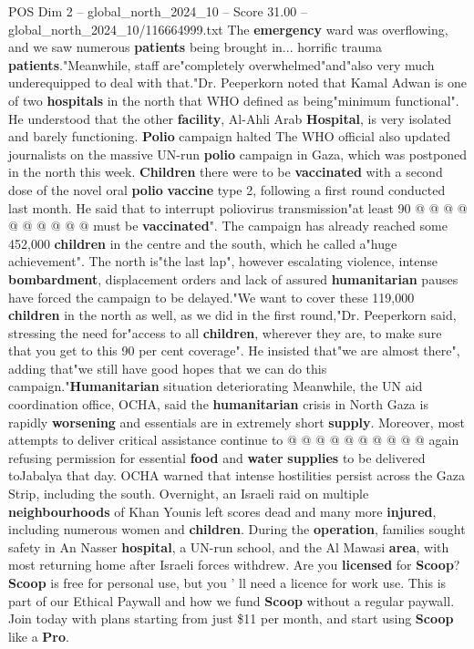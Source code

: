 \begin{textsample}{POS Dim 2 – global\_north\_2024\_10 – Score 31.00 – global\_north\_2024\_10/116664999.txt}
The \textbf{emergency} ward was overflowing, and we saw numerous \textbf{patients} being brought in... horrific trauma \textbf{patients}."Meanwhile, staff are"completely overwhelmed"and"also very much underequipped to deal with that."Dr.
Peeperkorn noted that Kamal Adwan is one of two \textbf{hospitals} in the north that WHO defined as being"minimum functional".
He understood that the other \textbf{facility}, Al-Ahli Arab \textbf{Hospital}, is very isolated and barely functioning. \textbf{Polio} campaign halted The WHO official also updated journalists on the massive UN-run \textbf{polio} campaign in Gaza, which was postponed in the north this week. \textbf{Children} there were to be \textbf{vaccinated} with a second dose of the novel oral \textbf{polio} \textbf{vaccine} type 2, following a first round conducted last month.
He said that to interrupt poliovirus transmission"at least 90 @ @ @ @ @ @ @ @ @ @ must be \textbf{vaccinated}".
The campaign has already reached some 452,000 \textbf{children} in the centre and the south, which he called a"huge achievement".
The north is"the last lap", however escalating violence, intense \textbf{bombardment}, displacement orders and lack of assured \textbf{humanitarian} pauses have forced the campaign to be delayed."We want to cover these 119,000 \textbf{children} in the north as well, as we did in the first round,"Dr.
Peeperkorn said, stressing the need for"access to all \textbf{children}, wherever they are, to make sure that you get to this 90 per cent coverage".
He insisted that"we are almost there", adding that"we still have good hopes that we can do this campaign."\textbf{Humanitarian} situation deteriorating Meanwhile, the UN aid coordination office, OCHA, said the \textbf{humanitarian} crisis in North Gaza is rapidly \textbf{worsening} and essentials are in extremely short \textbf{supply}.
Moreover, most attempts to deliver critical assistance continue to @ @ @ @ @ @ @ @ @ @ again refusing permission for essential \textbf{food} and \textbf{water} \textbf{supplies} to be delivered toJabalya that day.
OCHA warned that intense hostilities persist across the Gaza Strip, including the south.
Overnight, an Israeli raid on multiple \textbf{neighbourhoods} of Khan Younis left scores dead and many more \textbf{injured}, including numerous women and \textbf{children}.
During the \textbf{operation}, families sought safety in An Nasser \textbf{hospital}, a UN-run school, and the Al Mawasi \textbf{area}, with most returning home after Israeli forces withdrew.
Are you \textbf{licensed} for \textbf{Scoop}? \textbf{Scoop} is free for personal use, but you ' ll need a licence for work use.
This is part of our Ethical Paywall and how we fund \textbf{Scoop} without a regular paywall.
Join today with plans starting from just \$11 per month, and start using \textbf{Scoop} like a \textbf{Pro}.

\end{textsample}
